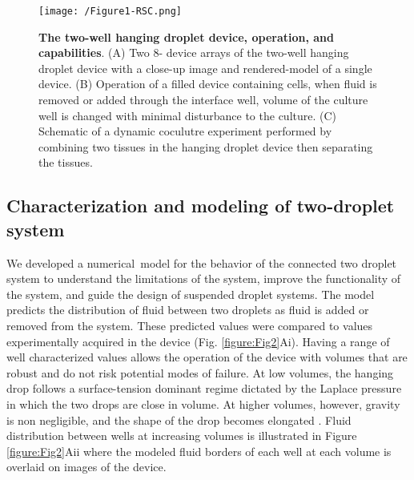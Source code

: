 \begin{figure}[h!] %
\centering
\texttt{[image: /Figure1-RSC.png]}
\caption[\textbf{The two-well hanging droplet device, operation, and capabilities}]{\textbf{The two-well hanging droplet device, operation, and capabilities}. (A) Two 8- device arrays of the two-well hanging droplet device with a close-up image and rendered-model of a single device. (B) Operation of a filled device containing cells, when fluid is removed or added through the interface well, volume of the culture well is changed with minimal disturbance to the culture. (C) Schematic of a dynamic coculutre experiment performed by combining two tissues in the hanging droplet device then separating the tissues.}
\label{figure:Fig1}
\end{figure}


\subsection{Characterization and modeling of two-droplet system}
We developed a numerical model for the behavior of the connected two droplet system to understand the limitations of the system, improve the functionality of the system, and guide the design of suspended droplet systems. The model predicts the distribution of fluid between two droplets as fluid is added or removed from the system. These predicted values were compared to values experimentally acquired in the device (Fig. \ref{figure:Fig2}Ai). Having a range of well characterized values allows the operation of the device with volumes that are robust and do not risk potential modes of failure. At low volumes, the hanging drop follows a surface-tension dominant regime dictated by the Laplace pressure \cite{Walker2002, Berthier2007} in which the two drops are close in volume. At higher volumes, however, gravity is non negligible, and the shape of the drop becomes elongated \cite{Carvajal2011}. Fluid distribution between wells at increasing volumes is illustrated in Figure \ref{figure:Fig2}Aii where the modeled fluid borders of each well at each volume is overlaid on images of the device. 

